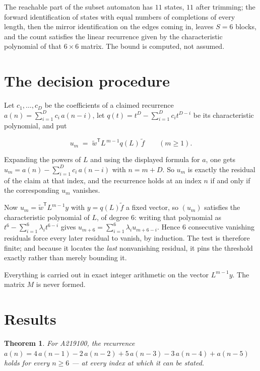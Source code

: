 \documentclass[11pt]{article}
\newtheorem{theorem}{Theorem}
\theoremstyle{definition}
\begin{document}
The reachable part of the subset automaton has $11$ states, $11$ after trimming; the forward identification of states with equal numbers of completions of every length, then the mirror identification on the edges coming in, leaves $S = 6$ blocks, and the count satisfies the linear recurrence given by the characteristic polynomial of that $6\times6$ matrix. The bound is computed, not assumed.

\section{The decision procedure}

Let $c_1,\dots,c_D$ be the coefficients of a claimed recurrence $a(n) = \sum_{i=1}^{D} c_i\,a(n-i)$, let $q(t) = t^{D} - \sum_{i=1}^{D} c_i t^{D-i}$ be its characteristic polynomial, and put

\[u_m \;=\; \tilde w^{\mathsf T} L^{\,m-1} q(L)\,\tilde f \qquad (m \ge 1).\]

Expanding the powers of $L$ and using the displayed formula for $a$, one gets $u_m = a(n) - \sum_{i=1}^{D} c_i\,a(n-i)$ with $n = m + D$. So $u_m$ is exactly the residual of the claim at that index, and the recurrence holds at an index $n$ if and only if the corresponding $u_m$ vanishes.

Now $u_m = \tilde w^{\mathsf T} L^{m-1} y$ with $y = q(L)\tilde f$ a fixed vector, so $(u_m)$ satisfies the characteristic polynomial of $L$, of degree $6$: writing that polynomial as $t^{6} - \sum_{i=1}^{6} \lambda_i t^{6-i}$ gives $u_{m+6} = \sum_{i=1}^{6} \lambda_i u_{m+6-i}$. Hence $6$ consecutive vanishing residuals force every later residual to vanish, by induction. The test is therefore finite; and because it locates the {\itshape last} nonvanishing residual, it pins the threshold exactly rather than merely bounding it.

Everything is carried out in exact integer arithmetic on the vector $L^{m-1}y$. The matrix $M$ is never formed.

\section{Results}

\begin{theorem} For A219100, the recurrence $a(n) = 4\,a(n-1) - 2\,a(n-2) + 5\,a(n-3) - 3\,a(n-4) + a(n-5)$ holds for every $n \ge 6$ --- at every index at which it can be stated.\end{theorem}
\end{document}
